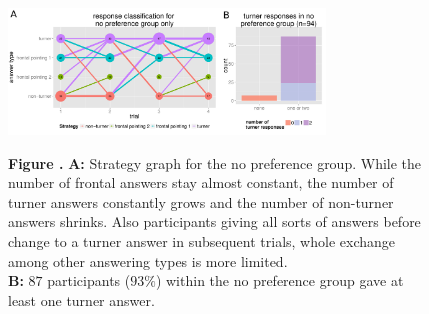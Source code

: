 \documentclass{frontiersSCNS} %
\begin{document}
\begin{figure}[h!]
\begin{center}
    \includegraphics[width=0.75\textwidth]{figures/stratGraphNP.pdf}
\end{center}
\textbf{\label{fig:06} Figure .}{  \textbf{A:} Strategy graph for the no preference group. While the number of frontal answers stay almost constant, the number of turner answers constantly grows and the number of non-turner answers shrinks. Also participants giving all sorts of answers before change to a turner answer in subsequent trials, whole exchange among other answering types is more limited.\\
\textbf{B:} $87$ participants ($93\%$) within the no preference group gave at least one turner answer.}
   \label{fig:npDevelopment}
\end{figure}



\end{document}

